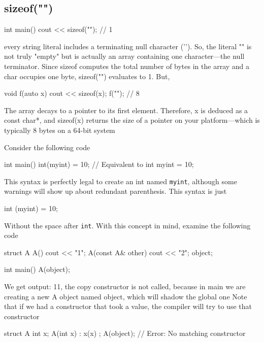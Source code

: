 \documentclass{report}
\begin{document}
\bigbreak \noindent 
\subsection{sizeof("")}
\bigbreak \noindent 
\begin{cppcode}
    int main() {
        cout << sizeof(""); // 1
    }
\end{cppcode}
\bigbreak \noindent 
every string literal includes a terminating null character ('\0'). So, the literal "" is not truly "empty" but is actually an array containing one character—the null terminator. Since sizeof computes the total number of bytes in the array and a char occupies one byte, sizeof("") evaluates to 1.
\bigbreak \noindent 
But,
\bigbreak \noindent 
\begin{cppcode}
void f(auto x) {
    cout << sizeof(x);
}
f(""); // 8
\end{cppcode}
\bigbreak \noindent 
 The array decays to a pointer to its first element. Therefore, x is deduced as a const char*, and sizeof(x) returns the size of a pointer on your platform—which is typically 8 bytes on a 64-bit system


\pagebreak 
{}
\bigbreak \noindent 
Consider the following code
\bigbreak \noindent 
\begin{cppcode}
    int main() {
        int(myint) = 10; 
        // Equivalent to
        int myint = 10;
    }
\end{cppcode}
\bigbreak \noindent 
This syntax is perfectly legal to create an int named \texttt{myint}, although some warnings will show up about redundant parenthesis. This syntax is just
\bigbreak \noindent 
\begin{cppcode}
int (myint) = 10;
\end{cppcode}
\bigbreak \noindent 
Without the space after \texttt{int}. With this concept in mind, examine the following code
\bigbreak \noindent 
\begin{cppcode}
    struct A {
        A() {cout << "1";}
        A(const A& other) { cout << "2"; }
    } object;

    int main() {
        A(object);
    }
\end{cppcode}
\bigbreak \noindent 
We get output: 11, the copy constructor is not called, because in main we are creating a new A object named object, which will shadow the global one
\bigbreak \noindent 
Note that if we had a constructor that took a value, the compiler will try to use that constructor
\bigbreak \noindent 
\begin{cppcode}
    struct A {
        int x{};   
        A(int x) : x(x) {}
    };
    A(object); // Error: No matching constructor
\end{cppcode}
\end{document}
